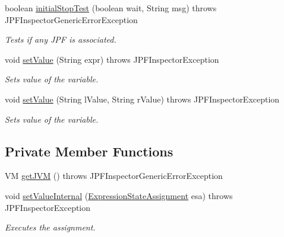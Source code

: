 \begin{DoxyCompactItemize}
boolean \hyperlink{classgov_1_1nasa_1_1jpf_1_1inspector_1_1server_1_1programstate_1_1_program_state_manager_a37515b553e6100226774a8fe54725a6b}{initial\+Stop\+Test} (boolean wait, String msg)  throws J\+P\+F\+Inspector\+Generic\+Error\+Exception 
\begin{DoxyCompactList}\small\item\em Tests if any J\+PF is associated. \end{DoxyCompactList}\item 
void \hyperlink{classgov_1_1nasa_1_1jpf_1_1inspector_1_1server_1_1programstate_1_1_program_state_manager_a75133d9acd32d5e0d94e63b25594866b}{set\+Value} (String expr)  throws J\+P\+F\+Inspector\+Exception 
\begin{DoxyCompactList}\small\item\em Sets value of the variable. \end{DoxyCompactList}\item 
void \hyperlink{classgov_1_1nasa_1_1jpf_1_1inspector_1_1server_1_1programstate_1_1_program_state_manager_a5a008bc92c261213623bd6a8dfc291bb}{set\+Value} (String l\+Value, String r\+Value)  throws J\+P\+F\+Inspector\+Exception 
\begin{DoxyCompactList}\small\item\em Sets value of the variable. \end{DoxyCompactList}\end{DoxyCompactItemize}
\subsection*{Private Member Functions}
\begin{DoxyCompactItemize}
\item 
VM \hyperlink{classgov_1_1nasa_1_1jpf_1_1inspector_1_1server_1_1programstate_1_1_program_state_manager_a64f4af50fdeccedaf6e9b832feb6e489}{get\+J\+VM} ()  throws J\+P\+F\+Inspector\+Generic\+Error\+Exception 
\item 
void \hyperlink{classgov_1_1nasa_1_1jpf_1_1inspector_1_1server_1_1programstate_1_1_program_state_manager_a8f3aec5fc9aa4a34d67c159ed00f762b}{set\+Value\+Internal} (\hyperlink{classgov_1_1nasa_1_1jpf_1_1inspector_1_1server_1_1expression_1_1expressions_1_1_expression_state_assignment}{Expression\+State\+Assignment} esa)  throws J\+P\+F\+Inspector\+Exception 
\begin{DoxyCompactList}\small\item\em Executes the assignment. \end{DoxyCompactList}\end{DoxyCompactItemize}
